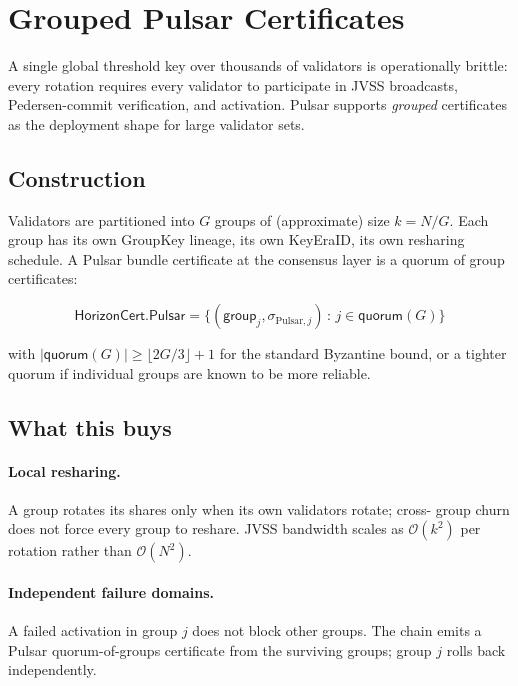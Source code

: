 \section{Grouped Pulsar Certificates}
\label{sec:grouped}

A single global threshold key over thousands of validators is
operationally brittle: every rotation requires every validator to
participate in JVSS broadcasts, Pedersen-commit verification, and
activation. Pulsar supports \emph{grouped} certificates as the
deployment shape for large validator sets.

\subsection{Construction}

Validators are partitioned into $G$ groups of (approximate) size
$k = N / G$. Each group has its own GroupKey lineage, its own
KeyEraID, its own resharing schedule. A Pulsar bundle certificate at
the consensus layer is a quorum of group certificates:

\[
  \mathsf{HorizonCert}.\mathsf{Pulsar} = \bigl\{ (\mathsf{group}_j, \sigma_{\mathrm{Pulsar},j}) \,:\, j \in \mathsf{quorum}(G) \bigr\}
\]

with $|\mathsf{quorum}(G)| \geq \lfloor 2G/3 \rfloor + 1$ for the
standard Byzantine bound, or a tighter quorum if individual groups are
known to be more reliable.

\subsection{What this buys}

\paragraph{Local resharing.}
A group rotates its shares only when its own validators rotate; cross-
group churn does not force every group to reshare. JVSS bandwidth
scales as $\mathcal{O}(k^2)$ per rotation rather than
$\mathcal{O}(N^2)$.

\paragraph{Independent failure domains.}
A failed activation in group $j$ does not block other groups. The chain
emits a Pulsar quorum-of-groups certificate from the surviving groups;
group $j$ rolls back independently.

